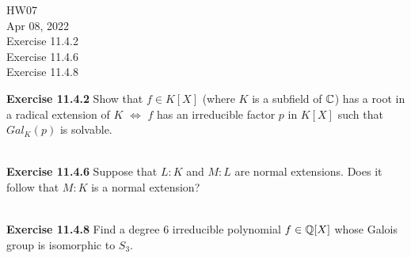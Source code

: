 \documentclass{article}
\begin{document}
\maketitle
HW07 \\
Apr 08, 2022 \\
Exercise 11.4.2\\
Exercise 11.4.6\\
Exercise 11.4.8\\
\pagebreak

\begin{homeworkProblem}
    \textbf{Exercise 11.4.2} Show that $f \in K[X]$ (where $K$ is a subfield of $\mathbb{C}$) has a root
    in a radical extension of $K$ $\iff$ $f$ has an irreducible factor $p$ in $K[X]$ 
    such that $Gal_K(p)$ is solvable.\\
    \solution \\



\end{homeworkProblem}

\pagebreak


\begin{homeworkProblem}
    \textbf{Exercise 11.4.6} Suppose that $L:K$ and $M:L$ are normal extensions.
    Does it follow that $M:K$ is a normal extension?\\
    \solution \\

\end{homeworkProblem}

\pagebreak

\begin{homeworkProblem}
    \textbf{Exercise 11.4.8} Find a degree $6$ irreducible polynomial $f \in \mathbb{Q}[X]$
    whose Galois group is isomorphic to $S_3$.\\
    \solution \\


\end{homeworkProblem}
\end{document}
